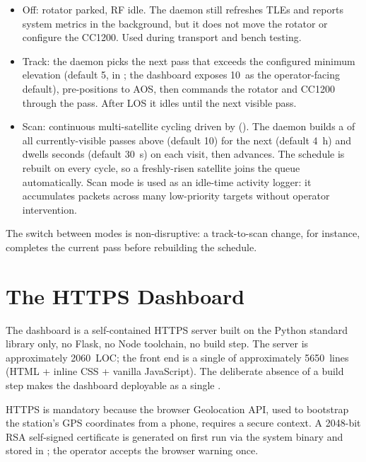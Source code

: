 \begin{itemize}
    \item Off: rotator parked, RF idle. The daemon still refreshes TLEs and reports system metrics in the background, but it does not move the rotator or configure the CC1200. Used during transport and bench testing.
    \item Track: the daemon picks the next pass that exceeds the configured minimum elevation (default 5\degree,  in ; the dashboard exposes 10\degree\ as the operator-facing default), pre-positions to AOS, then commands the rotator and CC1200 through the pass. After LOS it idles until the next visible pass.
    \item Scan: continuous multi-satellite cycling driven by  (). The daemon builds a  of all currently-visible passes above  (default 10\degree) for the next  (default 4~h) and dwells  seconds (default 30~s) on each visit, then advances. The schedule is rebuilt on every cycle, so a freshly-risen satellite joins the queue automatically. Scan mode is used as an idle-time activity logger: it accumulates packets across many low-priority targets without operator intervention.
\end{itemize}

The switch between modes is non-disruptive: a track-to-scan change, for instance, completes the current pass before rebuilding the schedule.

\section{The HTTPS Dashboard}
\label{sec:dashboard}

The dashboard is a self-contained HTTPS server built on the Python standard library only, no Flask, no Node toolchain, no build step. The server is approximately 2060~LOC; the front end is a single  of approximately 5650~lines (HTML + inline CSS + vanilla JavaScript). The deliberate absence of a build step makes the dashboard deployable as a single .

HTTPS is mandatory because the browser Geolocation API, used to bootstrap the station's GPS coordinates from a phone, requires a secure context. A 2048-bit RSA self-signed certificate is generated on first run via the system  binary and stored in ; the operator accepts the browser warning once.


